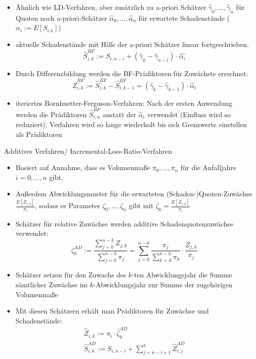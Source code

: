 \documentclass[12pt]{report}
\theoremstyle{dotless}
\theoremstyle{definition}
\begin{document}
\begin{itemize}
\item Ähnlich wie LD-Verfahren, aber zusätzlich zu a-priori Schätzer $\hat{\gamma}_0, ..., \hat{\gamma}_n$ für Quoten noch a-priori-Schätzer $\hat{\alpha}_0, ..., \hat{\alpha}_n$ für erwartete Schadenstände ($\alpha_i := E[S_{i.n}]$)
\item aktuelle Schadenstände mit Hilfe der a-priori Schätzer linear fortgeschrieben.
\begin{equation}
\hat{S}_{i,k}^{BF} := S_{i,n-i}+(\hat{\gamma}_k-\hat{\gamma}_{n-i})\cdot \hat{\alpha_i}
\end{equation}
\item Durch Differenzbildung werden die BF-Prädiktoren für Zuwächste errechnet:
\begin{equation}
\hat{Z}_{i,k}^{BF} := \hat{S}_{i,k}^{BF} - \hat{S}_{i,k-1}^{BF} = (\hat{\gamma}_k - \hat{\gamma}_{k-1}) \cdot \hat{\alpha}_i
\end{equation}
\item iteriertes Bornhuetter-Ferguson-Verfahren: Nach der ersten Anwendung werden die Prädiktoren $\hat{S}_{i,n}^{BF}$ anstatt der $\hat{\alpha}_i$ verwendet (Einfluss wird so reduziert). Verfahren wird so lange wiederholt bis sich Grenzwerte einstellen als Prädiktoren
\end{itemize}
Additives Verfahren/ Incremental-Loss-Ratio-Verfahren
\begin{itemize}
\item Basiert auf Annahme, dass es Volumenmaße $\pi_0, ..., \pi_n$ für die Anfalljahre $i=0,...,n$ gibt.
\item Außerdem Abwicklungsmuster für die erwarteten (Schaden-)Quoten-Zuwächse $\frac{E[Z_{i,k}]}{\pi_i}$, sodass es Parameter $\zeta_0,...,\zeta_n$ gibt mit $\zeta_k=\frac{E[Z_{i,k}]}{\pi_i}$
\item Schätzer für relative Zuwächse werden additive Schadenquotenzuwächse verwendet:
\begin{equation}
\zeta_k^{AD} := \frac{\sum_{j=0}^{n-k} Z_{j,k}}{\sum_{j=0}^{n-k} \pi_j} = \sum_{j=0}^{n-k} \frac{\pi_j}{\sum_{h=0}^{n-k} \pi_h} \cdot \frac{Z_{j,k}}{\pi_j}
\end{equation}
\item Schätzer setzen für den Zuwachs des $k$-ten Abwicklungsjahr die Summe sämtlicher Zuwächse im $k$-Abwicklungsjahr zur Summe der zugehörigen Volumenmaße
\item Mit diesen Schätzern erhält man Prädiktoren für Zuwächse und Schadenstände:
\begin{align}
\hat{Z}_{i,k} := \pi_i \cdot \hat{\zeta}_k^{AD} \\
\hat{S}_{i,k}^{AD} := S_{i,n-i} + \sum_{j=n-i+1}^k \hat{Z}_{i,j}^{AD}
\end{align}
\end{itemize}
\end{document}
